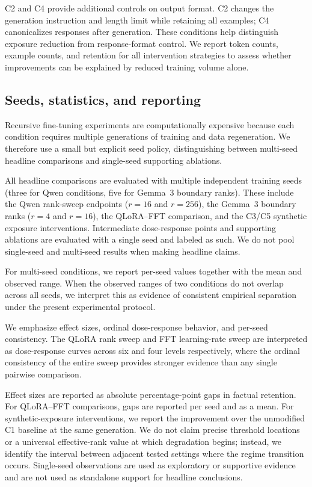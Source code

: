 \documentclass[a4paper,fleqn]{cas-dc}
\begin{document}
C2 and C4 provide additional controls on output format. C2 changes the generation
instruction and length limit while retaining all examples; C4 canonicalizes
responses after generation. These conditions help distinguish exposure reduction
from response-format control. We report token counts, example counts, and
retention for all intervention strategies to assess whether improvements can be
explained by reduced training volume alone.

\subsection{Seeds, statistics, and reporting}\label{sec:statistics}

Recursive fine-tuning experiments are computationally expensive because each
condition requires multiple generations of training and data regeneration. We
therefore use a small but explicit seed policy, distinguishing between
multi-seed headline comparisons and single-seed supporting ablations.

All headline comparisons are evaluated with multiple independent training seeds
(three for Qwen conditions, five for Gemma~3 boundary ranks). These
include the Qwen rank-sweep endpoints ($r=16$ and $r=256$), the Gemma~3 boundary
ranks ($r=4$ and $r=16$), the QLoRA--FFT comparison, and the C3/C5 synthetic
exposure interventions. Intermediate dose-response points and supporting
ablations are evaluated with a single seed and labeled as such. We do not pool
single-seed and multi-seed results when making headline claims.

For multi-seed conditions, we report per-seed values together with the mean and
observed range. When the observed ranges of two conditions do not overlap across
all seeds, we interpret this as evidence of consistent empirical separation
under the present experimental protocol.

We emphasize
effect sizes, ordinal dose-response behavior, and per-seed consistency. The
QLoRA rank sweep and FFT learning-rate sweep are interpreted as dose-response
curves across six and four levels respectively, where the ordinal consistency of
the entire sweep provides stronger evidence than any single pairwise comparison.

Effect sizes are reported as absolute percentage-point gaps in factual retention.
For QLoRA--FFT comparisons, gaps are reported per seed and as a mean. For
synthetic-exposure interventions, we report the improvement over the unmodified
C1 baseline at the same generation. We do not claim precise threshold locations
or a universal effective-rank value at which degradation begins; instead, we
identify the interval between adjacent tested settings where the regime
transition occurs. Single-seed observations are used as exploratory or
supportive evidence and are not used as standalone support for headline
conclusions.
\end{document}

